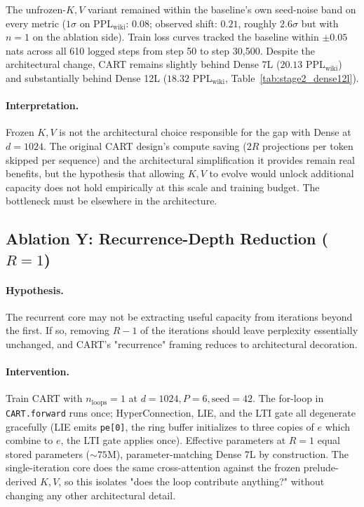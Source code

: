 \documentclass{article}
\newcommand{\cart}{\textsc{CART}}
\newcommand{\pplwiki}{PPL$_\text{wiki}$}
\begin{document}
The unfrozen-$K, V$ variant remained within the baseline's own seed-noise band on every metric ($1\sigma$ on \pplwiki: $0.08$; observed shift: $0.21$, roughly $2.6\sigma$ but with $n{=}1$ on the ablation side). Train loss curves tracked the baseline within $\pm 0.05$ nats across all 610 logged steps from step 50 to step 30{,}500. Despite the architectural change, \cart{} remains slightly behind Dense 7L ($20.13$ \pplwiki) and substantially behind Dense 12L ($18.32$ \pplwiki, Table~\ref{tab:stage2_dense12l}).

\paragraph{Interpretation.}
Frozen $K, V$ is not the architectural choice responsible for the gap with Dense at $d{=}1024$. The original \cart{} design's compute saving ($2R$ projections per token skipped per sequence) and the architectural simplification it provides remain real benefits, but the hypothesis that allowing $K, V$ to evolve would unlock additional capacity does not hold empirically at this scale and training budget. The bottleneck must be elsewhere in the architecture.

\subsection{Ablation Y: Recurrence-Depth Reduction ($R{=}1$)}
\label{sec:abl_r1}

\paragraph{Hypothesis.}
The recurrent core may not be extracting useful capacity from iterations beyond the first. If so, removing $R{-}1$ of the iterations should leave perplexity essentially unchanged, and \cart{}'s "recurrence" framing reduces to architectural decoration.

\paragraph{Intervention.}
Train \cart{} with $n_\text{loops} = 1$ at $d{=}1024, P{=}6, \text{seed}{=}42$. The for-loop in \texttt{CART.forward} runs once; HyperConnection, LIE, and the LTI gate all degenerate gracefully (LIE emits \texttt{pe[0]}, the ring buffer initializes to three copies of $e$ which combine to $e$, the LTI gate applies once). Effective parameters at $R{=}1$ equal stored parameters ($\sim 75$M), parameter-matching Dense 7L by construction. The single-iteration core does the same cross-attention against the frozen prelude-derived $K, V$, so this isolates "does the loop contribute anything?" without changing any other architectural detail.
\end{document}
